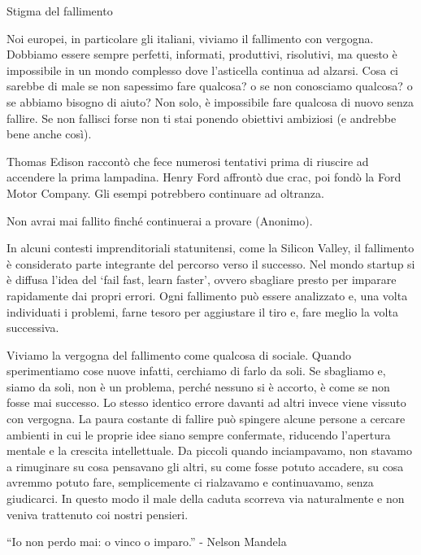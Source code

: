 \documentclass[12pt]{book} %
\begin{document}
\begin{mdframed}[linewidth=1pt]
Stigma del fallimento

Noi europei, in particolare gli italiani, viviamo il fallimento con vergogna. Dobbiamo essere sempre
perfetti, informati, produttivi, risolutivi, ma questo è impossibile in un mondo complesso dove
l'asticella continua ad alzarsi. Cosa ci sarebbe di male se non sapessimo fare qualcosa? o se non
conosciamo qualcosa? o se abbiamo bisogno di aiuto? Non solo, è impossibile fare qualcosa di nuovo senza fallire. Se non fallisci forse non ti stai ponendo obiettivi ambiziosi (e andrebbe bene anche così).

Thomas Edison raccontò che fece numerosi tentativi prima di riuscire ad accendere la prima lampadina. Henry Ford affrontò due crac, poi fondò la Ford Motor Company. Gli esempi potrebbero continuare ad oltranza.

Non avrai mai fallito finché continuerai a provare (Anonimo).

In alcuni contesti imprenditoriali statunitensi, come la Silicon Valley, il fallimento è considerato parte integrante del percorso verso il successo. Nel mondo startup si è diffusa l’idea del ‘fail fast, learn faster’, ovvero sbagliare presto per imparare rapidamente dai propri errori. Ogni
fallimento può essere analizzato e, una volta individuati i problemi, farne tesoro per aggiustare il tiro e, fare
meglio la volta successiva. 

Viviamo la vergogna del fallimento come qualcosa di sociale. Quando sperimentiamo cose nuove infatti, cerchiamo di farlo da soli. Se sbagliamo e, siamo da soli, non è un
problema, perché nessuno si è accorto, è come se non fosse mai successo. Lo stesso identico errore davanti ad altri
invece viene vissuto con vergogna. La paura costante di fallire può spingere alcune persone a cercare ambienti in cui le proprie idee siano sempre confermate, riducendo l’apertura mentale e la crescita intellettuale. Da piccoli quando inciampavamo,
non stavamo a rimuginare su cosa pensavano gli altri, su come fosse potuto accadere, su cosa avremmo potuto fare,
semplicemente ci rialzavamo e continuavamo, senza giudicarci. In questo modo il male della caduta scorreva via
naturalmente e non veniva trattenuto coi nostri pensieri. 

“Io non perdo mai: o vinco o imparo.” - Nelson Mandela 
\end{mdframed}
\end{document}
